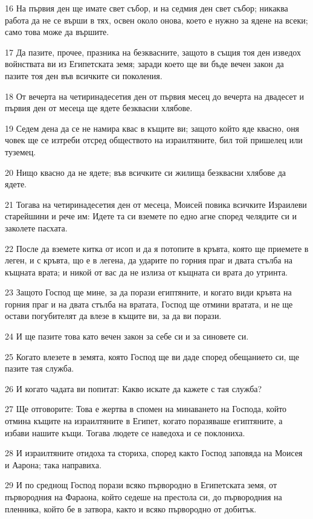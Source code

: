 \par 16 На първия ден ще имате свет събор, и на седмия ден свет събор; никаква работа да не се върши в тях, освен около онова, което е нужно за ядене на всеки; само това може да вършите.
\par 17 Да пазите, прочее, празника на безквасните, защото в същия тоя ден изведох войнствата ви из Египетската земя; заради което ще ви бъде вечен закон да пазите тоя ден във всичките си поколения.
\par 18 От вечерта на четиринадесетия ден от първия месец до вечерта на двадесет и първия ден от месеца ще ядете безквасни хлябове.
\par 19 Седем дена да се не намира квас в къщите ви; защото който яде квасно, оня човек ще се изтреби отсред обществото на израилтяните, бил той пришелец или туземец.
\par 20 Нищо квасно да не ядете; във всичките си жилища безквасни хлябове да ядете.
\par 21 Тогава на четиринадесетия ден от месеца, Моисей повика всичките Израилеви старейшини и рече им: Идете та си вземете по едно агне според челядите си и заколете пасхата.
\par 22 После да вземете китка от исоп и да я потопите в кръвта, която ще приемете в леген, и с кръвта, що е в легена, да ударите по горния праг и двата стълба на къщната врата; и никой от вас да не излиза от къщната си врата до утринта.
\par 23 Защото Господ ще мине, за да порази египтяните, и когато види кръвта на горния праг и на двата стълба на вратата, Господ ще отмини вратата, и не ще остави погубителят да влезе в къщите ви, за да ви порази.
\par 24 И ще пазите това като вечен закон за себе си и за синовете си.
\par 25 Когато влезете в земята, която Господ ще ви даде според обещанието си, ще пазите тая служба.
\par 26 И когато чадата ви попитат: Какво искате да кажете с тая служба?
\par 27 Ще отговорите: Това е жертва в спомен на минаването на Господа, който отмина къщите на израилтяните в Египет, когато поразяваше египтяните, а избави нашите къщи. Тогава людете се наведоха и се поклониха.
\par 28 И израилтяните отидоха та сториха, според както Господ заповяда на Моисея и Аарона; така направиха.
\par 29 И по среднощ Господ порази всяко първородно в Египетската земя, от първородния на Фараона, който седеше на престола си, до първородния на пленника, който бе в затвора, както и всяко първородно от добитък.
